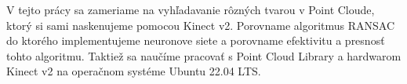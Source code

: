 V tejto prácy sa zameriame na vyhľadavanie rôzných tvarou v Point Cloude, ktorý si sami naskenujeme pomocou Kinect v2. Porovname algoritmus RANSAC do ktorého implementujeme neuronove siete a porovname efektivitu a presnosť tohto algoritmu. Taktiež sa naučíme pracovať s Point Cloud Library a hardwarom Kinect v2 na operačnom systéme Ubuntu 22.04 LTS.